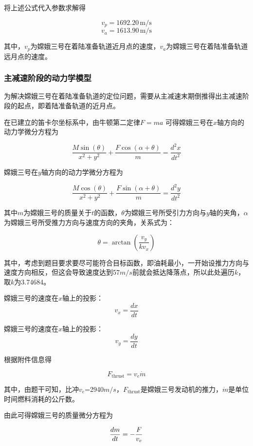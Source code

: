 \documentclass{ctexart}
\begin{document}
将上述公式代入参数求解得

\[v_p = 1692.20 \, \text{m} / \text{s}\]
\[v_a = 1613.90 \, \text{m} / \text{s}\]

其中，\(v_p\)为嫦娥三号在着陆准备轨道近月点的速度，\(v_a\)为嫦娥三号在着陆准备轨道远月点的速度。

    \subsubsection{主减速阶段的动力学模型}
为解决嫦娥三号在着陆准备轨道的定位问题，需要从主减速末期倒推得出主减速阶段的起点，即着陆准备轨道的近月点。

在已建立的笛卡尔坐标系中，由牛顿第二定律\(F=ma\)
可得嫦娥三号在\(x\)轴方向的动力学微分方程为

\begin{equation}
\frac{M \sin(\theta)}{x^2 + y^2} + \frac{F \cos(\alpha + \theta)}{m} = \frac{d^2 x}{dt^2}
\end{equation}

嫦娥三号在\(y\)轴方向的动力学微分方程为

\begin{equation}
\frac{M \cos(\theta)}{x^2 + y^2} + \frac{F \sin(\alpha + \theta)}{m} = \frac{d^2 y}{dt^2}
\end{equation}

其中\(m\)为嫦娥三号的质量关于\(t\)的函数，\(\theta\)为嫦娥三号所受引力方向与\(y\)轴的夹角，\(\alpha\)为嫦娥三号所受推力方向与速度方向的夹角，关系式为：

\[\theta = \arctan \left( \frac{v_{y}}{{k}{v_{x}}} \right)\]

其中，考虑到题目要求要尽可能符合目标函数，即油耗最小，一开始设推力方向与速度方向相反，但这会导致速度达到57\(m/s\)前就会抵达降落点，所以此处遍历\(k\)，取\(k\)为3.74684。

嫦娥三号的速度在\(x\)轴上的投影：
\[v_x = \frac{dx}{dt}\]

嫦娥三号的速度在\(x\)轴上的投影：
\[v_y = \frac{dy}{dt}\]

根据附件信息得

\begin{equation}
F_{\text{thrust}} = v_e \dot{m}
\end{equation}

其中，由题干可知，比冲\(v_e\)=2940\(m/s\)，\(F_{\text{thrust}}\)是嫦娥三号发动机的推力，\(\dot{m}\)是单位时间燃料消耗的公斤数。

由此可得嫦娥三号的质量微分方程为

\begin{equation}
\frac{dm}{dt} = -\frac{F}{v_e} \\
\end{equation}
\end{document}
